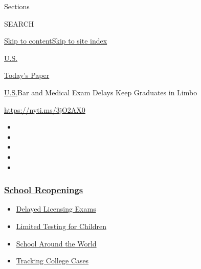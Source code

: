 Sections

SEARCH

\protect\hyperlink{site-content}{Skip to
content}\protect\hyperlink{site-index}{Skip to site index}

\href{https://www.nytimes3xbfgragh.onion/section/us}{U.S.}

\href{https://myaccount.nytimes3xbfgragh.onion/auth/login?response_type=cookie\&client_id=vi}{}

\href{https://www.nytimes3xbfgragh.onion/section/todayspaper}{Today's
Paper}

\href{/section/us}{U.S.}\textbar{}Bar and Medical Exam Delays Keep
Graduates in Limbo

\url{https://nyti.ms/3jO2AX0}

\begin{itemize}
\item
\item
\item
\item
\item
\end{itemize}

\hypertarget{school-reopenings}{%
\subsubsection{\texorpdfstring{\href{https://www.nytimes3xbfgragh.onion/spotlight/schools-reopening?name=styln-coronavirus-schools-reopening\&region=TOP_BANNER\&block=storyline_menu_recirc\&action=click\&pgtype=Article\&impression_id=73af9050-f281-11ea-aef1-df8e69b7388b\&variant=undefined}{School
Reopenings}}{School Reopenings}}\label{school-reopenings}}

\begin{itemize}
\tightlist
\item
  \href{https://www.nytimes3xbfgragh.onion/2020/09/04/us/bar-exam-coronavirus.html?name=styln-coronavirus-schools-reopening\&region=TOP_BANNER\&block=storyline_menu_recirc\&action=click\&pgtype=Article\&impression_id=73af9051-f281-11ea-aef1-df8e69b7388b\&variant=undefined}{Delayed
  Licensing Exams}
\item
  \href{https://www.nytimes3xbfgragh.onion/2020/09/08/upshot/children-testing-shortfalls-virus.html?name=styln-coronavirus-schools-reopening\&region=TOP_BANNER\&block=storyline_menu_recirc\&action=click\&pgtype=Article\&impression_id=73af9052-f281-11ea-aef1-df8e69b7388b\&variant=undefined}{Limited
  Testing for Children}
\item
  \href{https://www.nytimes3xbfgragh.onion/2020/09/01/world/schools-reopen-globe-students.html?name=styln-coronavirus-schools-reopening\&region=TOP_BANNER\&block=storyline_menu_recirc\&action=click\&pgtype=Article\&impression_id=73af9053-f281-11ea-aef1-df8e69b7388b\&variant=undefined}{School
  Around the World}
\item
  \href{https://www.nytimes3xbfgragh.onion/interactive/2020/us/covid-college-cases-tracker.html?name=styln-coronavirus-schools-reopening\&region=TOP_BANNER\&block=storyline_menu_recirc\&action=click\&pgtype=Article\&impression_id=73afb760-f281-11ea-aef1-df8e69b7388b\&variant=undefined}{Tracking
  College Cases}
\end{itemize}

